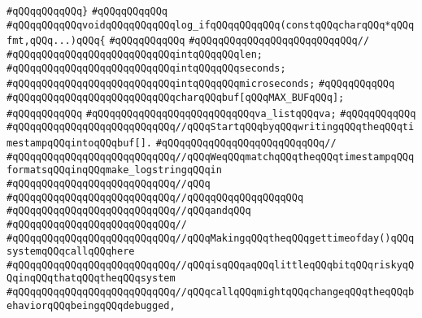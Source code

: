 \verb|#qQQqqQQqqQQq}|\newline
\verb|#qQQqqQQqqQQq|\newline
\verb|#qQQqqQQqqQQqvoidqQQqqQQqqQQqlog_ifqQQqqQQqqQQq(constqQQqcharqQQq*qQQqfmt,qQQq...)qQQq{|\newline
\verb|#qQQqqQQqqQQq|\newline
\verb|#qQQqqQQqqQQqqQQqqQQqqQQqqQQq//|\newline
\verb|#qQQqqQQqqQQqqQQqqQQqqQQqqQQqintqQQqqQQqlen;|\newline
\verb|#qQQqqQQqqQQqqQQqqQQqqQQqqQQqintqQQqqQQqseconds;|\newline
\verb|#qQQqqQQqqQQqqQQqqQQqqQQqqQQqintqQQqqQQqmicroseconds;|\newline
\verb|#qQQqqQQqqQQq|\newline
\verb|#qQQqqQQqqQQqqQQqqQQqqQQqqQQqcharqQQqbuf[qQQqMAX_BUFqQQq];|\newline
\verb|#qQQqqQQqqQQq|\newline
\verb|#qQQqqQQqqQQqqQQqqQQqqQQqqQQqva_listqQQqva;|\newline
\verb|#qQQqqQQqqQQq|\newline
\verb|#qQQqqQQqqQQqqQQqqQQqqQQqqQQq//qQQqStartqQQqbyqQQqwritingqQQqtheqQQqtimestampqQQqintoqQQqbuf[].|\newline
\verb|#qQQqqQQqqQQqqQQqqQQqqQQqqQQq//|\newline
\verb|#qQQqqQQqqQQqqQQqqQQqqQQqqQQq//qQQqWeqQQqmatchqQQqtheqQQqtimestampqQQqformatsqQQqinqQQqmake_logstringqQQqin|\newline
\verb|#qQQqqQQqqQQqqQQqqQQqqQQqqQQq//qQQq|\newline
\verb|#qQQqqQQqqQQqqQQqqQQqqQQqqQQq//qQQqqQQqqQQqqQQqqQQq|\newline
\verb|#qQQqqQQqqQQqqQQqqQQqqQQqqQQq//qQQqandqQQq|\newline
\verb|#qQQqqQQqqQQqqQQqqQQqqQQqqQQq//|\newline
\verb|#qQQqqQQqqQQqqQQqqQQqqQQqqQQq//qQQqMakingqQQqtheqQQqgettimeofday()qQQqsystemqQQqcallqQQqhere|\newline
\verb|#qQQqqQQqqQQqqQQqqQQqqQQqqQQq//qQQqisqQQqaqQQqlittleqQQqbitqQQqriskyqQQqinqQQqthatqQQqtheqQQqsystem|\newline
\verb|#qQQqqQQqqQQqqQQqqQQqqQQqqQQq//qQQqcallqQQqmightqQQqchangeqQQqtheqQQqbehaviorqQQqbeingqQQqdebugged,|\newline
